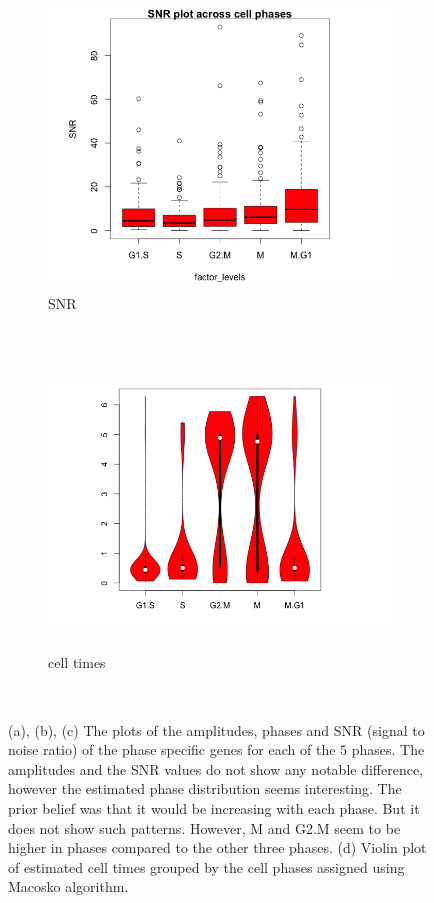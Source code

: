 \documentclass[11pt]{article}
\begin{document}
\begin{figure}[ht]
     \begin{subfigure}[t]{0.5\textwidth}
        \centering
        \includegraphics[height=3in]{../figures/cell_order_R_figs/snr_plot_genes_ipsc.png}
        \caption{SNR}
    \end{subfigure}%
    ~
       \begin{subfigure}[t]{0.5\textwidth}
        \centering
        \includegraphics[height=3in]{../figures/cell_order_R_figs/cell_times_plot.png}
        \caption{cell times}
    \end{subfigure}\\
    
    \caption{(a), (b), (c) The plots of the amplitudes, phases and SNR (signal to noise ratio) of the phase specific genes for each of the $5$ phases. The amplitudes and the SNR values do not show any notable difference, however the estimated phase distribution seems interesting. The prior belief was that it would be increasing with each phase. But it does not show such patterns. However, M and G2.M seem to be higher in phases compared to the other three phases. (d) Violin plot of estimated cell times grouped by the cell phases assigned using Macosko algorithm.}
 \label{fig:fig4}
 \end{figure}
 
\end{document}
